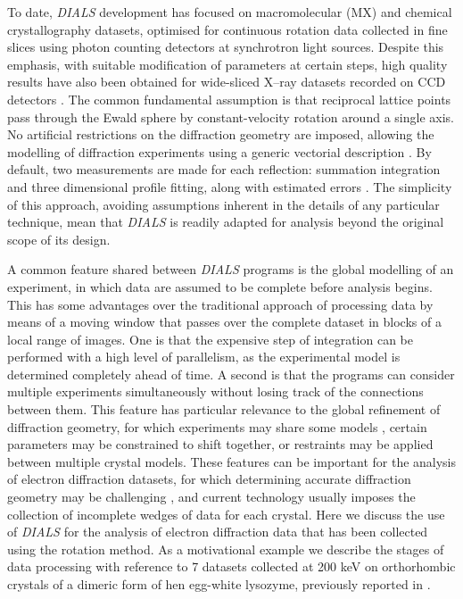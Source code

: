 \documentclass[preprint]{iucr}
\newcommand{\dials}{\emph{DIALS}\xspace}
\begin{document}
To date, \dials development has focused on macromolecular (MX) and chemical
crystallography datasets, optimised for continuous rotation data collected in
fine slices using photon counting detectors at synchrotron light sources.
Despite this emphasis, with suitable modification of parameters at certain
steps, high quality results have also been obtained for wide-sliced X--ray
datasets recorded on CCD detectors \cite{dials_adsc:2016a,dials_adsc:2016b}. The common
fundamental assumption is that reciprocal lattice points pass through the Ewald
sphere by constant-velocity rotation around a single axis.
No artificial restrictions on the diffraction geometry are imposed, allowing the
modelling of diffraction experiments using a generic vectorial description
\cite{Waterman2016}. By default, two measurements are made for each reflection:
summation integration and three dimensional profile fitting, along with
estimated errors \cite{Winter2018}. The simplicity of this approach, avoiding
assumptions inherent in the details of any particular technique, mean that
\dials is readily adapted for analysis beyond the original scope of its design.

A common feature shared between \dials programs is the global modelling of an
experiment, in which data are assumed to be complete before analysis begins.
This has some advantages over the traditional approach of processing data by
means of a moving window that passes over the complete dataset in blocks of a
local range of images. One is that the expensive step of integration can be
performed with a high level of parallelism, as the experimental model is
determined completely ahead of time. A second is that the programs can consider
multiple experiments simultaneously without losing track of the connections
between them. This feature has particular relevance to the global refinement of
diffraction geometry, for which experiments may share some models
\cite{Waterman2016}, certain parameters may be constrained to shift together,
or restraints may be applied between multiple crystal models. These features
can be important for the analysis of electron diffraction datasets, for which
determining accurate diffraction geometry may be challenging
\cite{review_adt_red:2015}, and current technology usually imposes the
collection of incomplete wedges of data for each crystal. Here we discuss the
use of \dials for the analysis of electron diffraction data that has been
collected using the rotation method. As a motivational example we describe the
stages of data processing with reference to 7 datasets collected at 200 keV on
orthorhombic crystals of a dimeric form of hen egg-white lysozyme, previously
reported in .
\end{document}

